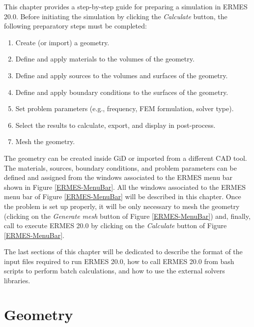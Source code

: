 %
%

This chapter provides a step-by-step guide for preparing a simulation in ERMES 20.0. Before initiating the simulation by clicking the \textit{Calculate} button, the following preparatory steps must be completed:
\begin{enumerate}\itemsep0em 
	\item Create (or import) a geometry.
	\item Define and apply materials to the volumes of the geometry.
	\item Define and apply sources to the volumes and surfaces of the geometry.
	\item Define and apply boundary conditions to the surfaces of the geometry.
	\item Set problem parameters (e.g., frequency, FEM formulation, solver type).
	\item Select the results to calculate, export, and display in post-process.
	\item Mesh the geometry. 
\end{enumerate}
The geometry can be created inside GiD or imported from a different CAD tool. The materials, sources, boundary conditions, and problem parameters can be defined and assigned from the windows associated to the ERMES menu bar shown in Figure \ref{ERMES-MenuBar}. All the windows associated to the ERMES menu bar of Figure \ref{ERMES-MenuBar} will be described in this chapter. Once the problem is set up properly, it will be only necessary to mesh the geometry (clicking on the \textit{Generate mesh} button of Figure \ref{ERMES-MenuBar}) and, finally, call to execute ERMES 20.0 by clicking on the \textit{Calculate} button of Figure \ref{ERMES-MenuBar}.

The last sections of this chapter will be dedicated to describe the format of the input files required to run ERMES 20.0, how to call ERMES 20.0 from bash scripts to perform batch calculations, and how to use the external solvers libraries.

\section{Geometry}

